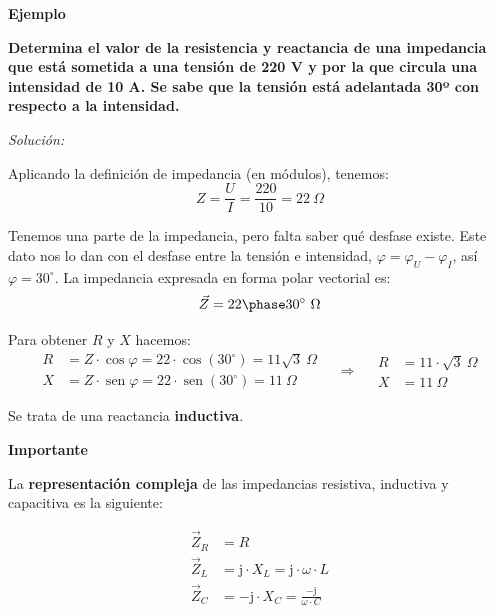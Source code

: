 \documentclass[
  a4paper,
  DIV=11,
  numbers=noendperiod]{scrreprt}
\newcommand{\sen}{\operatorname{sen}}
\begin{document}
\begin{tcolorbox}[enhanced jigsaw, breakable, colback=white, left=2mm, leftrule=.75mm, rightrule=.15mm, toprule=.15mm, colframe=quarto-callout-important-color-frame, arc=.35mm, bottomrule=.15mm, opacityback=0]

\vspace{-3mm}\textbf{Ejemplo}\vspace{3mm}

\textbf{Determina el valor de la resistencia y reactancia de una
impedancia que está sometida a una tensión de 220 V y por la que circula
una intensidad de 10 A. Se sabe que la tensión está adelantada 30º con
respecto a la intensidad.}

\emph{Solución:}

Aplicando la definición de impedancia (en módulos), tenemos:
\[Z = \frac{U}{I} = \frac{220}{10} = 22 \ \Omega\]

Tenemos una parte de la impedancia, pero falta saber qué desfase existe.
Este dato nos lo dan con el desfase entre la tensión e intensidad,
\(\varphi = \varphi_U - \varphi_I\), así \(\varphi = 30^\circ\). La
impedancia expresada en forma polar vectorial es:
\[\vec{Z} = 22 \phase 30^\circ \ \Omega\]

Para obtener \(R\) y \(X\) hacemos: \[
\begin{aligned}
R &= Z \cdot \cos \varphi = 22 \cdot \cos(30^\circ) = 11\sqrt{3} \ \Omega \\
X &= Z \cdot \sen \varphi = 22 \cdot \sen(30^\circ) = 11 \ \Omega
\end{aligned}
\quad \Rightarrow \quad
\boxed{
\begin{aligned}
R &= 11 \cdot \sqrt{3} \ \Omega \\
X &= 11 \ \Omega
\end{aligned}
}
\]

Se trata de una reactancia \textbf{inductiva}.

\end{tcolorbox}

\vspace{1em}

\begin{tcolorbox}[enhanced jigsaw, breakable, colback=white, left=2mm, leftrule=.75mm, rightrule=.15mm, toprule=.15mm, colframe=quarto-callout-warning-color-frame, arc=.35mm, bottomrule=.15mm, opacityback=0]

\vspace{-3mm}\textbf{Importante}\vspace{3mm}

La \textbf{representación compleja} de las impedancias resistiva,
inductiva y capacitiva es la siguiente:

\[
\begin{aligned}
\vec{Z}_R &= R \\[1ex]
\vec{Z}_L &= \mathrm{j} \cdot X_L = \mathrm{j} \cdot \omega \cdot L \\[1ex]
\vec{Z}_C &= -\mathrm{j} \cdot X_C = \frac{-\mathrm{j}}{\omega \cdot C}
\end{aligned}
\]

\end{tcolorbox}
\end{document}
